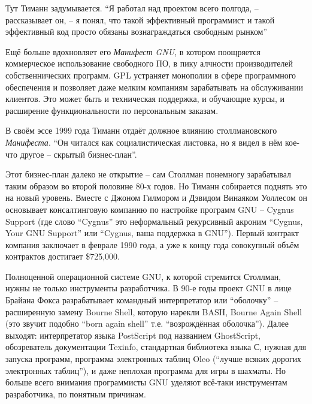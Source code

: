 Тут Тиманн задумывается. \enquote{Я работал над проектом всего полгода, -- рассказывает он, -- я понял, что такой эффективный программист и такой эффективный код просто обязаны вознаграждаться свободным рынком}

Ещё больше вдохновляет его \textit{Манифест GNU}, в котором поощряется коммерческое использование свободного ПО, в пику алчности производителей собственнических программ. GPL устраняет монополии в сфере программного обеспечения и позволяет даже мелким компаниям зарабатывать на обслуживании клиентов. Это может быть и техническая поддержка, и обучающие курсы, и расширение функциональности по персональным заказам.

В своём эссе 1999 года Тиманн отдаёт должное влиянию столлмановского \textit{Манифеста}. \enquote{Он читался как социалистическая листовка, но я видел в нём кое-что другое -- скрытый бизнес-план}. 

Этот бизнес-план далеко не открытие -- сам Столлман понемногу зарабатывал таким образом во второй половине 80-х годов. Но Тиманн собирается поднять это на новый уровень. Вместе с Джоном Гилмором и Дэвидом Винаяком Уоллесом он основывает консалтинговую компанию по настройке программ GNU -- Cygnus Support (где слово \enquote{Cygnus} это неформальный рекурсивный акроним \enquote{Cygnus, Your GNU Support} или \enquote{Cygnus, ваша поддержка в GNU}). Первый контракт компания заключает в феврале 1990 года, а уже к концу года совокупный объём контрактов достигает \$725,000.

Полноценной операционной системе GNU, к которой стремится Столлман, нужны не только инструменты разработчика. В 90-е годы проект GNU в лице Брайана Фокса разрабатывает командный интерпретатор или \enquote{оболочку} -- расширенную замену Bourne Shell, которую нарекли BASH, Bourne Again Shell (это звучит подобно \enquote{born again shell} т.е. \enquote{возрождённая оболочка}). Далее выходят: интерпретатор языка PostScript под названием GhostScript, обозреватель документации Texinfo, стандартная библиотека языка С, нужная для запуска программ, программа электронных таблиц Oleo (\enquote{лучше всяких дорогих электронных таблиц}), и даже неплохая программа для игры в шахматы. Но больше всего внимания программисты GNU уделяют всё-таки инструментам разработчика, по понятным причинам.

